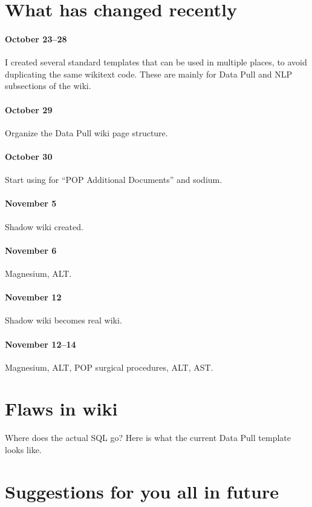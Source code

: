 \documentclass{tufte-handout}
\begin{document}
\section{What has changed recently}

\paragraph{October 23--28} I created several standard templates that
can be used in multiple places, to avoid duplicating the same wikitext
code. These are mainly for Data Pull and NLP subsections of the wiki. 

\paragraph{October 29} Organize the Data Pull wiki page structure. 

\paragraph{October 30} Start using for ``POP Additional Documents''
and sodium.

\paragraph{November 5} Shadow wiki created.

\paragraph{November 6} Magnesium, ALT.

\paragraph{November 12} Shadow wiki becomes real wiki.

\paragraph{November 12--14} Magnesium, ALT, POP surgical procedures,
ALT, AST.

\section{Flaws in wiki}

Where does the actual SQL go? Here is what the current Data Pull
template looks like.

\section{Suggestions for you all in future}
\end{document}
